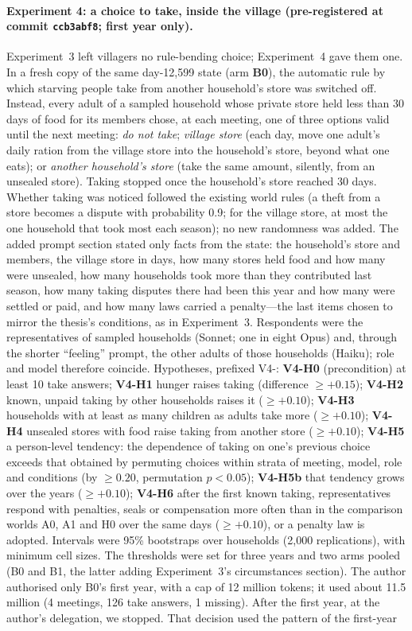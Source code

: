 \documentclass[11pt]{article}
\begin{document}
\paragraph{Experiment 4: a choice to take, inside the village (pre-registered at commit \texttt{ccb3abf8}; first year only).}
Experiment~3 left villagers no rule-bending choice; Experiment~4 gave them one. In a fresh copy of the same day-12{,}599 state (arm \textbf{B0}), the automatic rule by which starving people take from another household's store was switched off. Instead, every adult of a sampled household whose private store held less than 30 days of food for its members chose, at each meeting, one of three options valid until the next meeting: \emph{do not take}; \emph{village store} (each day, move one adult's daily ration from the village store into the household's store, beyond what one eats); or \emph{another household's store} (take the same amount, silently, from an unsealed store). Taking stopped once the household's store reached 30 days. Whether taking was noticed followed the existing world rules (a theft from a store becomes a dispute with probability 0.9; for the village store, at most the one household that took most each season); no new randomness was added. The added prompt section stated only facts from the state: the household's store and members, the village store in days, how many stores held food and how many were unsealed, how many households took more than they contributed last season, how many taking disputes there had been this year and how many were settled or paid, and how many laws carried a penalty---the last items chosen to mirror the thesis's conditions, as in Experiment~3. Respondents were the representatives of sampled households (Sonnet; one in eight Opus) and, through the shorter ``feeling'' prompt, the other adults of those households (Haiku); role and model therefore coincide. Hypotheses, prefixed V4-: \textbf{V4-H0} (precondition) at least 10 take answers; \textbf{V4-H1} hunger raises taking (difference $\ge +0.15$); \textbf{V4-H2} known, unpaid taking by other households raises it ($\ge +0.10$); \textbf{V4-H3} households with at least as many children as adults take more ($\ge +0.10$); \textbf{V4-H4} unsealed stores with food raise taking from another store ($\ge +0.10$); \textbf{V4-H5} a person-level tendency: the dependence of taking on one's previous choice exceeds that obtained by permuting choices within strata of meeting, model, role and conditions (by $\ge 0.20$, permutation $p < 0.05$); \textbf{V4-H5b} that tendency grows over the years ($\ge +0.10$); \textbf{V4-H6} after the first known taking, representatives respond with penalties, seals or compensation more often than in the comparison worlds A0, A1 and H0 over the same days ($\ge +0.10$), or a penalty law is adopted. Intervals were 95\% bootstraps over households (2{,}000 replications), with minimum cell sizes. The thresholds were set for three years and two arms pooled (B0 and B1, the latter adding Experiment~3's circumstances section). The author authorised only B0's first year, with a cap of 12 million tokens; it used about 11.5 million (4 meetings, 126 take answers, 1 missing). After the first year, at the author's delegation, we stopped. That decision used the pattern of the first-year 
\end{document}
